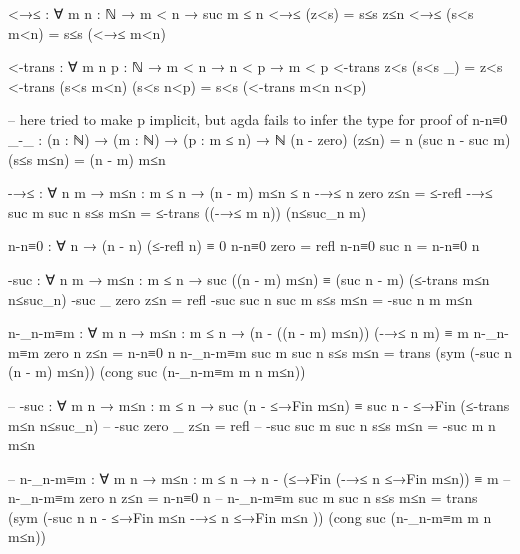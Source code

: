 \documentclass{article}
\begin{document}
\begin{code}
<→≤ : ∀ {m n : ℕ} → m < n → suc m ≤ n
<→≤ (z<s) = s≤s z≤n
<→≤ (s<s m<n) = s≤s (<→≤ m<n)

<-trans : ∀ {m n p : ℕ} → m < n → n < p → m < p
<-trans z<s (s<s _) = z<s
<-trans (s<s m<n) (s<s n<p) = s<s (<-trans m<n n<p)

-- here tried to make p implicit, but agda fails to infer the type for proof of n-n≡0
_-_ : (n : ℕ) → (m : ℕ) → (p : m ≤ n) → ℕ
(n - zero) (z≤n) = n
(suc n - suc m) (s≤s m≤n) = (n - m) m≤n

-→≤ : ∀ {n m} → {m≤n : m ≤ n} → (n - m) m≤n ≤ n
-→≤ {n} {zero} {z≤n} = ≤-refl
-→≤ {suc m} {suc n} {s≤s m≤n} = ≤-trans ((-→≤ {m} {n})) (n≤suc_n {m})

n-n≡0 : ∀ {n} → (n - n) (≤-refl {n}) ≡ 0
n-n≡0 {zero} = refl
n-n≡0 {suc n} = n-n≡0 {n}

-suc : ∀ {n m} → {m≤n : m ≤ n} → suc ((n - m) m≤n) ≡ (suc n - m) (≤-trans m≤n n≤suc_n)
-suc {_} {zero} {z≤n} = refl
-suc {suc n} {suc m} {s≤s m≤n} = -suc {n} {m} {m≤n}

n-_n-m≡m : ∀ {m n} → {m≤n : m ≤ n} → (n - ((n - m) m≤n)) (-→≤ {n} {m}) ≡ m 
n-_n-m≡m {zero} {n} {z≤n} = n-n≡0 {n}
n-_n-m≡m {suc m} {suc n} {s≤s m≤n} = trans (sym (-suc {n} {(n - m) m≤n})) (cong suc (n-_n-m≡m {m} {n} {m≤n}))

-- -suc : ∀ {m n} → {m≤n : m ≤ n} → suc (n - ≤→Fin m≤n) ≡ suc n - ≤→Fin (≤-trans m≤n n≤suc_n)
-- -suc {zero} {_} {z≤n} = refl
-- -suc {suc m} {suc n} {s≤s m≤n} = -suc {m} {n} {m≤n}

-- n-_n-m≡m : ∀ {m n} → {m≤n : m ≤ n} → n - (≤→Fin (-→≤ {n} {≤→Fin m≤n})) ≡ m
-- n-_n-m≡m {zero} {n} {z≤n} = n-n≡0 {n}
-- n-_n-m≡m {suc m} {suc n} {s≤s m≤n}  = trans (sym (-suc {n} {n - ≤→Fin m≤n} { -→≤ {n} {≤→Fin m≤n} })) (cong suc (n-_n-m≡m {m} {n} {m≤n}))
\end{code}
\end{document}
